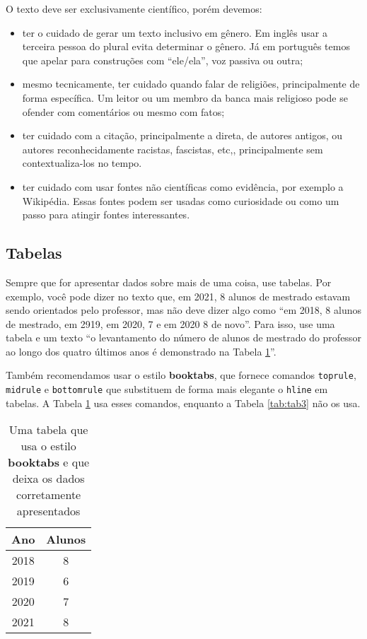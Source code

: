 \documentclass{article}
\begin{document}
O texto deve ser exclusivamente científico, porém devemos:
\begin{itemize}
    \item ter o cuidado de gerar um texto inclusivo em gênero. Em inglês usar a terceira pessoa do plural evita determinar o gênero. Já em português temos que apelar para construções com ``ele/ela'', voz passiva ou outra;
    \item mesmo tecnicamente, ter cuidado quando falar de religiões, principalmente de forma específica. Um leitor ou um membro da banca mais religioso pode se ofender com comentários ou mesmo com fatos;
    \item ter cuidado com a citação, principalmente a direta, de autores antigos, ou autores reconhecidamente racistas, fascistas, etc,, principalmente sem contextualiza-los no tempo.
    \item ter cuidado com usar fontes não científicas como evidência, por exemplo a Wikipédia. Essas fontes podem ser usadas como curiosidade ou como um passo para atingir fontes interessantes. 
\end{itemize}


\subsection{Tabelas}

Sempre que for apresentar dados sobre mais de uma coisa, use tabelas. Por exemplo, você pode dizer no texto que, em 2021, 8 alunos de mestrado estavam sendo orientados pelo professor, mas não deve dizer algo como ``em 2018, 8 alunos de mestrado, em 2919, em 2020, 7 e em 2020 8 de novo''. Para isso, use uma tabela e um texto ``o levantamento do número de alunos de mestrado do professor ao longo dos quatro últimos anos é demonstrado na Tabela \ref{tab:prof}''.

Também recomendamos usar o estilo \textbf{booktabs}, que fornece comandos \verb|toprule|, \verb|midrule| e \verb|bottomrule| que substituem de forma mais elegante o \verb|hline| em tabelas. A Tabela \ref{tab:prof} usa esses comandos, enquanto a Tabela \ref{tab:tab3} não os usa.

\begin{table}[]
    \centering
    \caption{Uma tabela que usa o estilo \textbf{booktabs} e que deixa os dados corretamente apresentados}
    \label{tab:prof}
    \begin{tabular}{cc}
        \toprule
        Ano  & Alunos \\ \midrule
        2018 & 8      \\
        2019 & 6      \\
        2020 & 7      \\
        2021 & 8      \\ \bottomrule
    \end{tabular}
\end{table}
\end{document}
